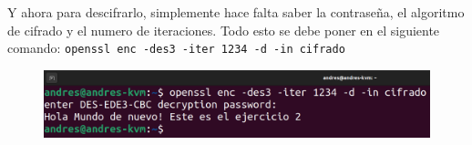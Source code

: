 \documentclass{article}
\begin{document}
Y ahora para descifrarlo, simplemente hace falta saber la contraseña, el algoritmo de cifrado y el numero de iteraciones. Todo esto se debe poner en el siguiente comando: \verb|openssl enc -des3 -iter 1234 -d -in cifrado|

\begin{figure}[H]
    \includegraphics[width=\textwidth]{imagenes/Captura desde 2022-10-19 17-54-02.png}
\end{figure}
\end{document}
